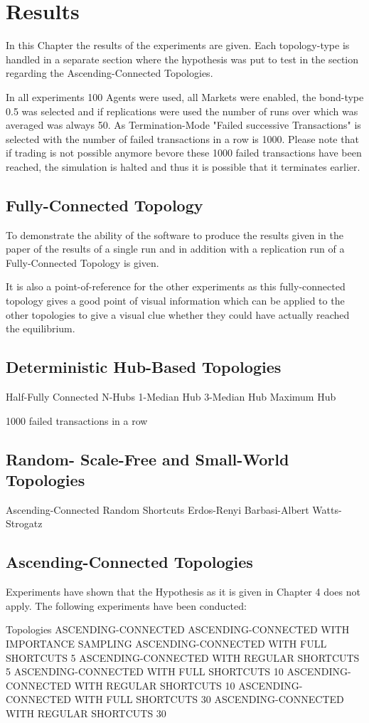 \documentclass[Bachelorarbeit.tex]{subfiles}
\begin{document}
\chapter{Results}

In this Chapter the results of the experiments are given. Each topology-type is handled in a separate section where the hypothesis was put to test in the section regarding the Ascending-Connected Topologies.

In all experiments 100 Agents were used, all Markets were enabled, the bond-type 0.5 was selected and if replications were used the number of runs over which was averaged was always 50.
As Termination-Mode "Failed successive Transactions" is selected with the number of failed transactions in a row is 1000. Please note that if trading is not possible anymore bevore these 1000 failed transactions have been reached, the simulation is halted and thus it is possible that it terminates earlier.

\section{Fully-Connected Topology}
To demonstrate the ability of the software to produce the results given in the paper of \cite{Breuer2015} the results of a single run and in addition with a replication run of a Fully-Connected Topology is given.

It is also a point-of-reference for the other experiments as this fully-connected topology gives a good point of visual information which can be applied to the other topologies to give a visual clue whether they could have actually reached the equilibrium.

\section{Deterministic Hub-Based Topologies} 

Half-Fully Connected
N-Hubs
1-Median Hub
3-Median Hub
Maximum Hub

1000 failed transactions in a row

\section{Random- Scale-Free and Small-World Topologies}
Ascending-Connected Random Shortcuts
Erdos-Renyi
Barbasi-Albert
Watts-Strogatz

\section{Ascending-Connected Topologies} 
Experiments have shown that the Hypothesis as it is given in Chapter 4 does not apply. The following experiments have been conducted:

Topologies
ASCENDING-CONNECTED
ASCENDING-CONNECTED WITH IMPORTANCE SAMPLING
ASCENDING-CONNECTED WITH FULL SHORTCUTS 5
ASCENDING-CONNECTED WITH REGULAR SHORTCUTS 5
ASCENDING-CONNECTED WITH FULL SHORTCUTS 10
ASCENDING-CONNECTED WITH REGULAR SHORTCUTS 10
ASCENDING-CONNECTED WITH FULL SHORTCUTS 30
ASCENDING-CONNECTED WITH REGULAR SHORTCUTS 30
\end{document}
